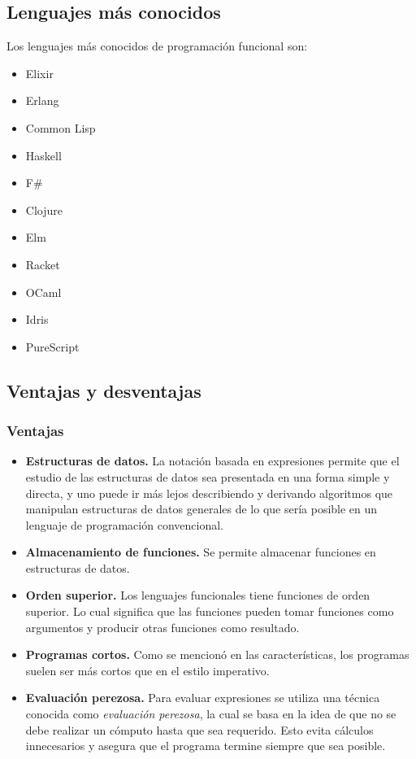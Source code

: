 \documentclass{article}
\begin{document}
\subsection{Lenguajes más conocidos}

Los lenguajes más conocidos de programación funcional son:

\begin{itemize}

\item Elixir
\item Erlang
\item Common Lisp
\item Haskell
\item F\#
\item Clojure
\item Elm
\item Racket
\item OCaml
\item Idris
\item PureScript

\end{itemize}

\subsection{Ventajas y desventajas}

\subsubsection*{Ventajas}

\begin{itemize}

\item \textbf{Estructuras de datos.} La notación basada en expresiones permite que el estudio de las estructuras de datos sea presentada en una forma simple y directa, y uno puede ir más lejos describiendo y derivando algoritmos que manipulan estructuras de datos generales de lo que sería posible en un lenguaje de programación convencional.

\item \textbf{Almacenamiento de funciones.} Se permite almacenar funciones en estructuras de datos.

\item \textbf{Orden superior.} Los lenguajes funcionales tiene funciones de orden superior. Lo cual significa que las funciones pueden tomar funciones como argumentos y producir otras funciones como resultado.

\item \textbf{Programas cortos.} Como se mencionó en las características, los programas suelen ser más cortos que en el estilo imperativo.

\item \textbf{Evaluación perezosa.} Para evaluar expresiones se utiliza una técnica conocida como \textit{evaluación perezosa}, la cual se basa en la idea de que no se debe realizar un cómputo hasta que sea requerido. Esto evita cálculos innecesarios y asegura que el programa termine siempre que sea posible.

\end{itemize}
\end{document}
